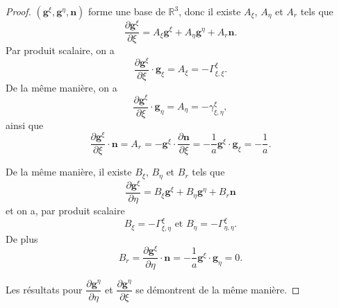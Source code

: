 \begin{proof}
$(\mathbf{g}^{\xi}, \mathbf{g}^{\eta}, \mathbf{n})$ forme une base de $\mathbb{R}^3$, donc il existe $A_{\xi}$, $A_{\eta}$ et $A_r$ tels que 
\begin{equation}
\dfrac{\partial \mathbf{g}^{\xi}}{\partial \xi} = A_{\xi} \mathbf{g}^{\xi} + A_{\eta} \mathbf{g}^{\eta} + A_r \mathbf{n}.
\end{equation}
Par produit scalaire, on a 
\begin{equation}
\dfrac{\partial \mathbf{g}^{\xi}}{\partial \xi} \cdot \mathbf{g}_{\xi} = A_{\xi} = - \Gamma_{\xi, \xi}^{\xi}.
\end{equation}
De la même manière, on a 
\begin{equation}
\dfrac{\partial \mathbf{g}^{\xi}}{\partial \xi} \cdot \mathbf{g}_{\eta} = A_{\eta} = - \gamma_{\xi, \eta}^{\xi},
\end{equation}
ainsi que
\begin{equation}
\dfrac{\partial \mathbf{g}^{\xi}}{\partial \xi} \cdot \mathbf{n} = A_r = - \mathbf{g}^{\xi} \cdot \dfrac{\partial \mathbf{n}}{\partial \xi} = - \dfrac{1}{a} \mathbf{g}^{\xi} \cdot \mathbf{g}_{\xi} = -\dfrac{1}{a}.
\end{equation}

De la même manière, il existe $B_{\xi}$, $B_{\eta}$ et $B_r$ tels que
\begin{equation}
\dfrac{\partial \mathbf{g}^{\xi}}{\partial \eta} = B_{\xi} \mathbf{g}^{\xi} + B_{\eta} \mathbf{g}^{\eta} + B_r \mathbf{n}
\end{equation}
et on a, par produit scalaire
\begin{equation}
B_{\xi} = - \Gamma_{\xi, \eta}^{\xi} \text{ et } B_{\eta} = - \Gamma_{\eta, \eta}^{\xi}.
\end{equation}
De plus
\begin{equation}
B_r = \dfrac{\partial \mathbf{g}^{\xi}}{\partial \eta} \cdot \mathbf{n} = - \dfrac{1}{a} \mathbf{g}^{\xi} \cdot \mathbf{g}_{\eta} = 0.
\end{equation}

Les résultats pour $\dfrac{\partial \mathbf{g}^{\eta}}{\partial \eta}$ et $\dfrac{\partial \mathbf{g}^{\eta}}{\partial \xi}$ se démontrent de la même manière.
\end{proof}


